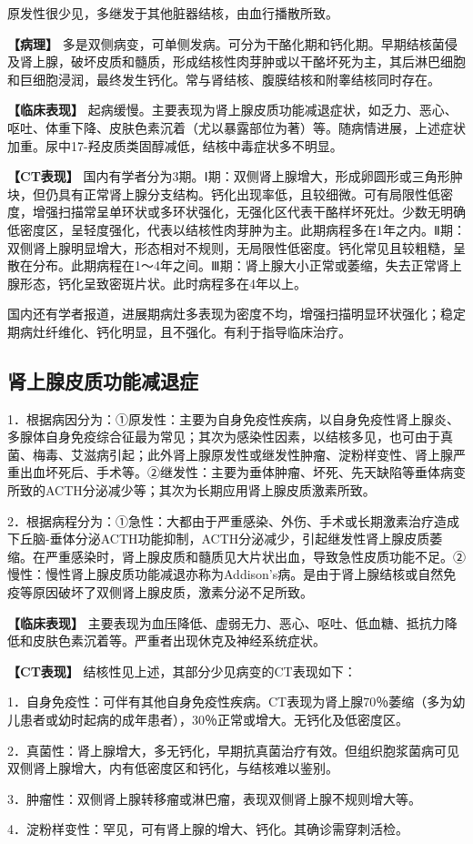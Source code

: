 原发性很少见，多继发于其他脏器结核，由血行播散所致。

\textbf{【病理】}
多是双侧病变，可单侧发病。可分为干酪化期和钙化期。早期结核菌侵及肾上腺，破坏皮质和髓质，形成结核性肉芽肿或以干酪坏死为主，其后淋巴细胞和巨细胞浸润，最终发生钙化。常与肾结核、腹膜结核和附睾结核同时存在。

\textbf{【临床表现】}
起病缓慢。主要表现为肾上腺皮质功能减退症状，如乏力、恶心、呕吐、体重下降、皮肤色素沉着（尤以暴露部位为著）等。随病情进展，上述症状加重。尿中17-羟皮质类固醇减低，结核中毒症状多不明显。

\textbf{【CT表现】}
国内有学者分为3期。Ⅰ期：双侧肾上腺增大，形成卵圆形或三角形肿块，但仍具有正常肾上腺分支结构。钙化出现率低，且较细微。可有局限性低密度，增强扫描常呈单环状或多环状强化，无强化区代表干酪样坏死灶。少数无明确低密度区，呈轻度强化，代表以结核性肉芽肿为主。此期病程多在1年之内。Ⅱ期：双侧肾上腺明显增大，形态相对不规则，无局限性低密度。钙化常见且较粗糙，呈散在分布。此期病程在1～4年之间。Ⅲ期：肾上腺大小正常或萎缩，失去正常肾上腺形态，钙化呈致密斑片状。此时病程多在4年以上。

国内还有学者报道，进展期病灶多表现为密度不均，增强扫描明显环状强化；稳定期病灶纤维化、钙化明显，且不强化。有利于指导临床治疗。

\subsection{肾上腺皮质功能减退症}

1．根据病因分为：①原发性：主要为自身免疫性疾病，以自身免疫性肾上腺炎、多腺体自身免疫综合征最为常见；其次为感染性因素，以结核多见，也可由于真菌、梅毒、艾滋病引起；此外肾上腺原发性或继发性肿瘤、淀粉样变性、肾上腺严重出血坏死后、手术等。②继发性：主要为垂体肿瘤、坏死、先天缺陷等垂体病变所致的ACTH分泌减少等；其次为长期应用肾上腺皮质激素所致。

2．根据病程分为：①急性：大都由于严重感染、外伤、手术或长期激素治疗造成下丘脑-垂体分泌ACTH功能抑制，ACTH分泌减少，引起继发性肾上腺皮质萎缩。在严重感染时，肾上腺皮质和髓质见大片状出血，导致急性皮质功能不足。②慢性：慢性肾上腺皮质功能减退亦称为Addison's病。是由于肾上腺结核或自然免疫等原因破坏了双侧肾上腺皮质，激素分泌不足所致。

\textbf{【临床表现】}
主要表现为血压降低、虚弱无力、恶心、呕吐、低血糖、抵抗力降低和皮肤色素沉着等。严重者出现休克及神经系统症状。

\textbf{【CT表现】} 结核性见上述，其部分少见病变的CT表现如下：

1．自身免疫性：可伴有其他自身免疫性疾病。CT表现为肾上腺70％萎缩（多为幼儿患者或幼时起病的成年患者），30％正常或增大。无钙化及低密度区。

2．真菌性：肾上腺增大，多无钙化，早期抗真菌治疗有效。但组织胞浆菌病可见双侧肾上腺增大，内有低密度区和钙化，与结核难以鉴别。

3．肿瘤性：双侧肾上腺转移瘤或淋巴瘤，表现双侧肾上腺不规则增大等。

4．淀粉样变性：罕见，可有肾上腺的增大、钙化。其确诊需穿刺活检。

\protect\hypertarget{text00024.html}{}{}

